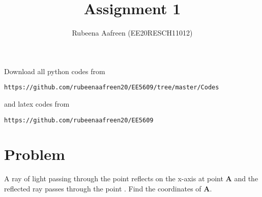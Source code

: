 \documentclass[journal,12pt,twocolumn]{IEEEtran}
\begin{document}
     \def\rightbox#1{\makebox[0in][r]{#1}}
     \def\centbox#1{\makebox[0in]{#1}}
     \def\topbox#1{\raisebox{-\baselineskip}[0in][0in]{#1}}
     \def\midbox#1{\raisebox{-0.5\baselineskip}[0in][0in]{#1}}
\vspace{3cm}
\title{Assignment 1}
\author{Rubeena Aafreen (EE20RESCH11012)}
\maketitle
\newpage
\bigskip
\renewcommand{\thefigure}{\theenumi}
\renewcommand{\thetable}{\theenumi}
Download all python codes from 
\begin{lstlisting}
https://github.com/rubeenaafreen20/EE5609/tree/master/Codes
\end{lstlisting}
%
and latex codes from 
%
\begin{lstlisting}
https://github.com/rubeenaafreen20/EE5609
\end{lstlisting}
%
\section{Problem}
A ray of light passing through the point 
reflects on the x-axis at point \textbf{A} and the reflected ray passes through the point . Find
the coordinates of \textbf{A}.
\end{document}
